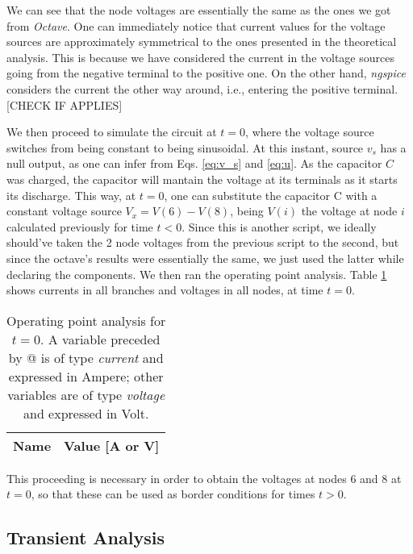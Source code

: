 \par We can see that the node voltages are essentially the same as the ones we got from \textit{Octave}. One can immediately notice that current values for the voltage sources are approximately symmetrical to the ones presented in the theoretical analysis. This is because we have considered the current in the voltage sources going from the negative terminal to the positive one. On the other hand, \emph{ngspice} considers the current the other way around, i.e., entering the positive terminal. [CHECK IF APPLIES]

\par We then proceed to simulate the circuit at $t=0$, where the voltage source switches from being constant to being sinusoidal. At this instant, source $v_s$ has a null output, as one can infer from Eqs. \ref{eq:v_s} and \ref{eq:u}. As the capacitor $C$ was charged, the capacitor will mantain the voltage at its terminals as it starts its discharge. This way, at $t=0$, one can substitute the capacitor C with a constant voltage source $V_x = V(6)-V(8)$, being $V(i)$ the voltage at node $i$ calculated previously for time $t<0$. Since this is another script, we ideally should've taken the 2 node voltages from the previous script to the second, but since the octave's results were essentially the same, we just used the latter while declaring the components. We then ran the operating point analysis. Table \ref{tab:ngspice_2} shows currents in all branches and voltages in all nodes, at time $t=0$.

\begin{multicols}{2}
\begin{table}[H]
  \centering
  \begin{tabular}{|l|r|}
    \hline
    {\bf Name} & {\bf Value [A or V]} \\ \hline
    
  \end{tabular}
  \caption{Operating point analysis for $t=0$. A variable preceded by @ is of type {\em current}
    and expressed in Ampere; other variables are of type {\it voltage} and expressed in
    Volt.}
  \label{tab:ngspice_2}
\end{table}
\end{multicols}

\par This proceeding is necessary in order to obtain the voltages at nodes 6 and 8 at $t=0$, so that these can be used as border conditions for times $t>0$. 

\subsection{Transient Analysis}

